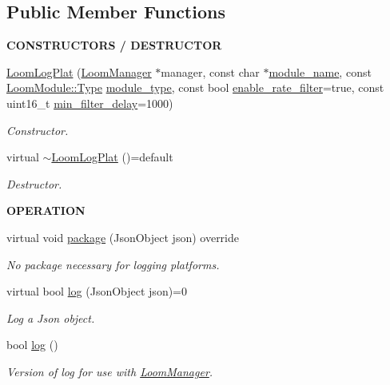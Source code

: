 \subsection*{Public Member Functions}
\begin{Indent}{\bf C\+O\+N\+S\+T\+R\+U\+C\+T\+O\+RS / D\+E\+S\+T\+R\+U\+C\+T\+OR}\par
\begin{DoxyCompactItemize}
\item 
\hyperlink{class_loom_log_plat_a95e7954d4d049c8481908ba248b1e57b}{Loom\+Log\+Plat} (\hyperlink{class_loom_manager}{Loom\+Manager} $\ast$manager, const char $\ast$\hyperlink{class_loom_module_adf6e68ad7e9fa2acfca7a8a280680764}{module\+\_\+name}, const \hyperlink{class_loom_module_aee91d0a75140d51ee428fc2d4417d865}{Loom\+Module\+::\+Type} \hyperlink{class_loom_module_a152d394f37236a2b159dae19da67eeb0}{module\+\_\+type}, const bool \hyperlink{class_loom_log_plat_a6d343b76b79a1e51572bcf2991966e61}{enable\+\_\+rate\+\_\+filter}=true, const uint16\+\_\+t \hyperlink{class_loom_log_plat_a3d4ffe4204560b9677b8007be7f522be}{min\+\_\+filter\+\_\+delay}=1000)
\begin{DoxyCompactList}\small\item\em Constructor. \end{DoxyCompactList}\item 
virtual \hyperlink{class_loom_log_plat_ac05c81b2e83214d22bdc94dfbb8a835c}{$\sim$\+Loom\+Log\+Plat} ()=default
\begin{DoxyCompactList}\small\item\em Destructor. \end{DoxyCompactList}\end{DoxyCompactItemize}
\end{Indent}
\begin{Indent}{\bf O\+P\+E\+R\+A\+T\+I\+ON}\par
\begin{DoxyCompactItemize}
\item 
virtual void \hyperlink{class_loom_log_plat_abddec0fce6ef786577ae008702c9393e}{package} (Json\+Object json) override
\begin{DoxyCompactList}\small\item\em No package necessary for logging platforms. \end{DoxyCompactList}\item 
virtual bool \hyperlink{class_loom_log_plat_accace14ed45817c98ef5ccc15fd79004}{log} (Json\+Object json)=0
\begin{DoxyCompactList}\small\item\em Log a Json object. \end{DoxyCompactList}\item 
bool \hyperlink{class_loom_log_plat_adabc1e04a045b91923cff425405c5039}{log} ()
\begin{DoxyCompactList}\small\item\em Version of log for use with \hyperlink{class_loom_manager}{Loom\+Manager}. \end{DoxyCompactList}\end{DoxyCompactItemize}
\end{Indent}
